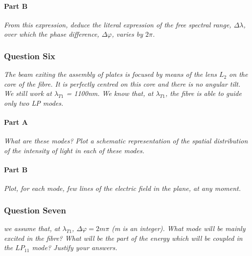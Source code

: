 \documentclass[colorlinks,11pt,a4paper,normalphoto,withhyper,ragged2e]{altareport}
\begin{document}
\paragraph{Part B \linebreak}
\textit{From this expression, deduce the literal expression of the free spectral range, $\Delta\lambda$, over which the phase difference, $\Delta\varphi$, varies by $2\pi$.} \linebreak




\subsubsection{Question Six}
\textit{The beam exiting the assembly of plates is focused by means of the lens $L_2$ on the core of the fibre. It is perfectly centred on this core and there is no angular tilt. We still work at $\lambda_{T1}$ = 1100nm. We know that, at $\lambda_{T1}$, the fibre is able to guide only two LP modes.} \linebreak


\paragraph{Part A \linebreak}
\textit{What are these modes? Plot a schematic representation of the spatial distribution of the intensity of light in each of these modes.} \linebreak




\paragraph{Part B \linebreak}
\textit{Plot, for each mode, few lines of the electric field in the plane, at any moment.} \linebreak




\subsubsection{Question Seven}
\textit{we assume that, at $\lambda_{T1}$, $\Delta\varphi = 2 m \pi$ (m is an integer). What mode will be mainly excited in the fibre? What will be the part of the energy which will be coupled in the $LP_{11}$ mode? Justify your answers.} \linebreak
\end{document}
